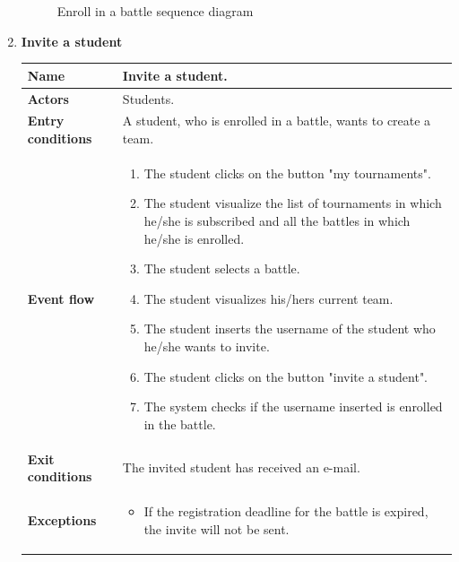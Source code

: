 \begin{enumerate}[label=\textbf{UC.\arabic*}]
\begin{figure}[h]
            \caption{Enroll in a battle sequence diagram}
            \label{fig:sd-enrollB}
        \end{figure}
        \clearpage
        \item {} \textbf{Invite a student}
        \begin{table}[h]
    	    \centering
                \renewcommand{\arraystretch}{1.5}
                \begin{tabular}{|m{3.2cm}|m{9.8cm}|}
                    \hline
                    \textbf{Name} & Invite a student. \\
                    \hline
                    \textbf{Actors} & Students. \\
                    \hline
                    \textbf{Entry conditions}  & A student, who is enrolled in a battle, wants to create a team. \\
                    \hline
                    \textbf{Event flow}  &  
                    \begin{enumerate}[label=\arabic*.]
                        \item The student clicks on the button "my tournaments".
                        \item The student visualize the list of tournaments in which he/she is subscribed and all the battles in which he/she is enrolled.
                        \item The student selects a battle.
                        \item The student visualizes his/hers current team.
                        \item The student inserts the username of the student who he/she wants to invite.
                        \item The student clicks on the button "invite a student".
                        \item The system checks if the username inserted is enrolled in the battle.
                    \end{enumerate}\\ 
                    \hline
                    \textbf{Exit conditions}  & The invited student has received an e-mail. \\
                    \hline
                    \textbf{Exceptions}  &
                    \begin{itemize}
                        \item If the registration deadline for the battle is expired, the invite will not be sent.

\end{itemize}
\end{tabular}
\end{table}
\end{enumerate}
